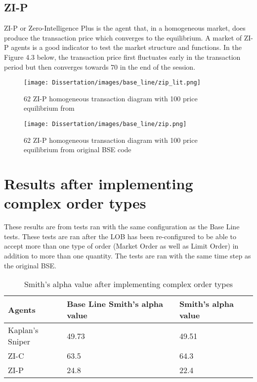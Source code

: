 \subsection{ZI-P}
ZI-P or Zero-Intelligence Plus is the agent that, in a homogeneous market, does produce the transaction price which converges to the equilibrium. A market of ZI-P agents is a good indicator to test the market structure and functions. In the Figure 4.3 below, the transaction price first fluctuates early in the transaction period but then converges towards 70 in the end of the session.  

\begin{figure}[h]
\texttt{[image: Dissertation/images/base\_line/zip\_lit.png]}
\caption{62 ZI-P homogeneous transaction diagram with 100 price equilibrium from \cite{BSE_lit}} 
\end{figure} 
\FloatBarrier

\begin{figure}[h]
\texttt{[image: Dissertation/images/base\_line/zip.png]}
\caption{62 ZI-P homogeneous transaction diagram with 100 price equilibrium from original BSE code} 
\end{figure} 
\FloatBarrier

\section{Results after implementing complex order types} 
These results are from tests ran with the same configuration as the Base Line tests. These tests are ran after the LOB has been re-configured to be able to accept more than one type of order (Market Order as well as Limit Order) in addition to more than one quantity. The tests are ran with the same time step as the original BSE. 

\begin{table}[h]
\centering
\begin{tabular}{ |m||p{4cm}|p{4cm}|} 
\hline
\textbf{Agents}& \textbf{Base Line Smith's alpha value}& \textbf{Smith's alpha value} \\
\hline
\hline
Kaplan's Sniper & 49.73  & 49.51 \\ 
\hline
ZI-C  & 63.5 & 64.3\\ 
\hline
ZI-P & 24.8 & 22.4 \\ 
\hline
\end{tabular}
\caption{Smith's alpha value after implementing complex order types}  
\end{table}
\FloatBarrier


